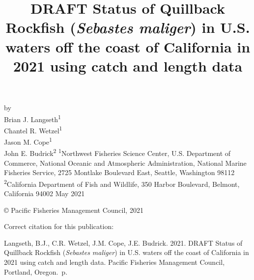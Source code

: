 \documentclass[11pt,
  english,
  a4paper,
]{article}
\date{}
\newcommand{\trTitle}{DRAFT Status of Quillback Rockfish (\emph{Sebastes maliger}) in U.S. waters off the coast of California in 2021 using catch and length data}
\newcommand{\trYear}{2021}
\newcommand{\trMonth}{May}
\newcommand{\trAuthsBack}{Langseth, B.J., C.R. Wetzel, J.M. Cope, J.E. Budrick}
\newcommand{\trCitation}{
\begin{hangparas}{1em}{1}
\trAuthsBack{}. \trYear{}. \trTitle{}. Pacific Fisheries Management Council, Portland, Oregon. \pageref{LastPage}{}\,p.
\end{hangparas}}
\begin{document}

\renewcommand*{\thefootnote}{\fnsymbol{footnote}}

\small
\thispagestyle{empty}
\noindent
\begin{center}
\title{DRAFT Status of Quillback Rockfish (\emph{Sebastes maliger}) in U.S. waters off the coast of California in 2021 using catch and length data}
\vspace{1.5cm}
{\Large\textbf{}}
\vfill
by\\
Brian J. Langseth\textsuperscript{1}\\
Chantel R. Wetzel\textsuperscript{1}\\
Jason M. Cope\textsuperscript{1}\\
John E. Budrick\textsuperscript{2}\vfill
\textsuperscript{1}Northwest Fisheries Science Center, U.S. Department of Commerce, National Oceanic and Atmospheric Administration, National Marine Fisheries Service, 2725 Montlake Boulevard East, Seattle, Washington 98112\\
\textsuperscript{2}California Department of Fish and Wildlife, 350 Harbor Boulevard, Belmont, California 94002\vfill
\trMonth{} \trYear{}
\end{center}
\clearpage

\thispagestyle{empty}
\vspace*{\fill}
\begin{center}
\copyright{} Pacific Fisheries Management Council, \trYear{}\\
\end{center}
\par
\bigskip
\noindent
Correct citation for this publication:
\bigskip
\par
\trCitation{}
\clearpage


\tableofcontents\clearpage
\listoffigures \listoftables \clearpage
\label{TRlastRoman}
\clearpage

\newpage
\thispagestyle{empty} %

\pagestyle{plain}  %
\renewcommand*{\thefootnote}{\arabic{footnote}}  %
\setcounter{footnote}{0}  %
\renewcommand{\headrulewidth}{0.5pt}
\renewcommand{\footrulewidth}{0.5pt}
\end{document}
